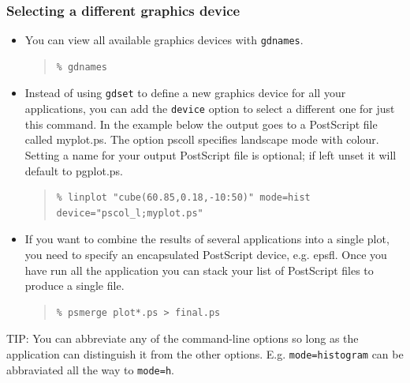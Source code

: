\documentclass[twoside,11pt]{article}
\newenvironment{latexonly}{}{}
\renewcommand{\_}{\texttt{\symbol{95}}}
\newenvironment{fmpage}[1]{\begin{lrbox}{\fmbox}\begin{minipage}{#1}}{\end{minipage}\end{lrbox}\fbox{\usebox{\fmbox}}}
\newenvironment{myquote}{
   \color{MidnightBlue}\begin{quote}\begin{small}}{
   \end{small}\end{quote}
}
\newcommand{\param}[1]{\texttt{#1}}
\renewenvironment{myquote}{
      \begin{quote}\begin{small}}{
      \end{small}\end{quote}
   }
\begin{document}
\subsubsection{Selecting a different graphics device}

\begin{itemize}
\item You can view all available graphics devices with \param{gdnames}.
\begin{myquote}
\begin{verbatim}
% gdnames
\end{verbatim}
\end{myquote}

\item Instead of using \param{gdset} to define a new graphics device for all your applications, you can add the \param{device} option to select a different one for just this command. In the example below the output goes to a PostScript file called myplot.ps. The option pscol\_l specifies landscape mode with colour. Setting a name for your output PostScript file is optional; if left unset it will default to pgplot.ps.
\begin{myquote}
\begin{verbatim}
% linplot "cube(60.85,0.18,-10:50)" mode=hist device="pscol_l;myplot.ps"
\end{verbatim}
\end{myquote}

\item If you want to combine the results of several applications into a single plot, you need to specify an encapsulated PostScript device, e.g. epsf\_l. Once you have run all the application you can stack your list of PostScript files to produce a single file.
\begin{myquote}
\begin{verbatim}
% psmerge plot*.ps > final.ps
\end{verbatim}
\end{myquote}
\end{itemize}


\begin{latexonly}
\begin{center}
\begin{fmpage}{0.95\linewidth}
\vspace{0.1cm}
TIP: You can abbreviate any of the command-line options so long as the application can distinguish it from the other options. E.g. \param{mode=histogram} can be abbraviated all the way to \param{mode=h}.
\end{fmpage}
\end{center}
\end{latexonly}
\end{document}
